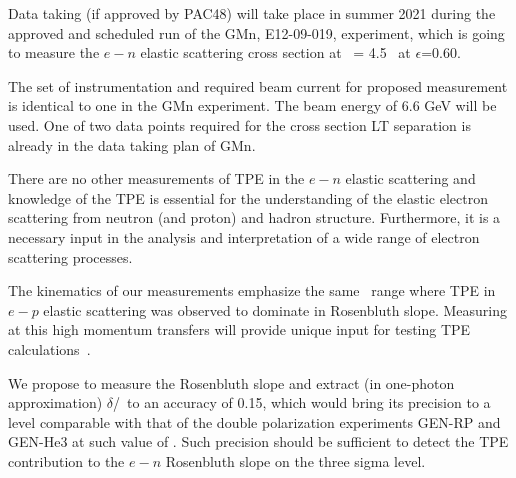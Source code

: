 Data taking (if approved by PAC48) will take place in summer 2021 during the approved and scheduled run of the GMn, E12-09-019, experiment,
which is going to measure the $e-n$ elastic scattering cross section at \qsq~= 4.5 \gevcsq~at $\epsilon$=0.60.

The set of instrumentation and required beam current for proposed measurement is identical to one in the GMn experiment.
The beam energy of 6.6 GeV will be used.
One of two data points required for the cross section LT separation is already in the data taking plan of GMn.

There are no other measurements of TPE in the $e-n$ elastic scattering and knowledge of the TPE is essential for the understanding 
of the elastic electron scattering from neutron (and proton) and hadron structure.  
Furthermore, it is a necessary input in the analysis and interpretation of a wide range of electron scattering processes. 

The kinematics of our measurements emphasize the same \qsq~range where TPE in $e-p$ elastic scattering was observed to dominate in Rosenbluth slope.
Measuring at this high momentum transfers will provide unique input for testing TPE calculations~\cite{Blunden:2005ew}.

We propose to measure the Rosenbluth slope and extract (in one-photon approximation) $\delta$\gen/\gmn~to an accuracy of 0.15, which would bring its precision to a level comparable with that of the double polarization experiments GEN-RP and GEN-He3 at such value of \qsq.
Such precision should be sufficient to detect the TPE contribution to the $e-n$ Rosenbluth slope on the three sigma level.
